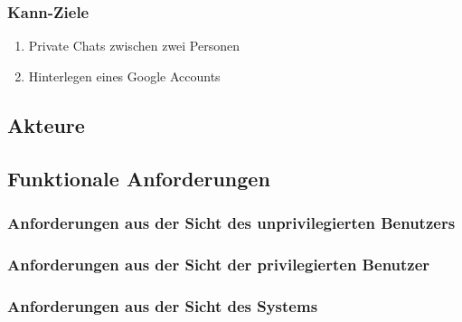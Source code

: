 \documentclass[12pt]{article}
\begin{document}
      \subsubsection{Kann-Ziele}
        \begin{enumerate}
          \item Private Chats zwischen zwei Personen
          \item Hinterlegen eines Google Accounts
        \end{enumerate}

    \subsection{Akteure}

    \subsection{Funktionale Anforderungen}
      \subsubsection{Anforderungen aus der Sicht des unprivilegierten Benutzers}
      \subsubsection{Anforderungen aus der Sicht der privilegierten Benutzer}
      \subsubsection{Anforderungen aus der Sicht des Systems}
\end{document}
